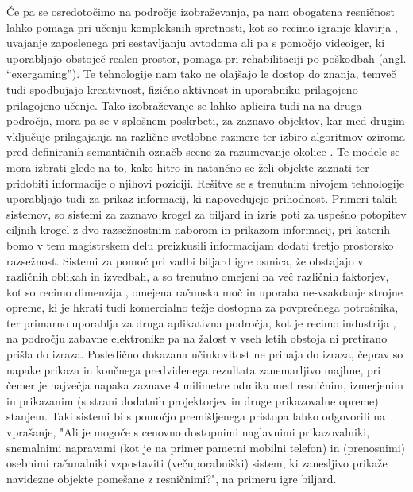 \documentclass[a4paper, 12pt]{book}
\begin{document}
Če pa se osredotočimo na področje izobraževanja, pa nam obogatena resničnost lahko pomaga pri učenju kompleksnih spretnosti, kot so recimo igranje klavirja \cite{McKenzie2022PianoVision}, uvajanje zaposlenega pri sestavljanju avtodoma ali pa s pomočjo videoiger, ki uporabljajo obstoječ realen prostor, pomaga pri rehabilitaciji po poškodbah (angl. ``exergaming'')\cite{Chow2023Exergaming}. Te tehnologije nam tako ne olajšajo le dostop do znanja, temveč tudi spodbujajo kreativnost, fizično aktivnost in uporabniku prilagojeno prilagojeno učenje.  Tako izobraževanje se lahko aplicira tudi na na druga področja, mora pa se v splošnem poskrbeti, za zaznavo objektov, kar med drugim vključuje prilagajanja na različne svetlobne razmere ter izbiro algoritmov oziroma pred-definiranih semantičnih označb scene za razumevanje okolice \cite{MetaDevelopers2024b}. Te modele se mora izbrati glede na to, kako hitro in natančno se želi objekte zaznati ter pridobiti informacije o njihovi poziciji. Rešitve se s trenutnim nivojem tehnologije uporabljajo tudi za prikaz informacij, ki napovedujejo prihodnost. Primeri takih sistemov, so sistemi za zaznavo krogel za biljard in izris poti za uspešno potopitev ciljnih krogel z dvo-razsežnostnim naborom in prikazom informacij, pri katerih bomo v tem magistrskem delu preizkusili informacijam dodati tretjo prostorsko razsežnost.
Sistemi za pomoč pri vadbi biljard igre osmica, že obstajajo v različnih oblikah in izvedbah, a so trenutno omejeni na več različnih faktorjev, kot so recimo dimenzija \cite{Sousa2016,BWisePool2025, schiott2025pix2pocketsshotsuggestions8ball}, omejena računska moč \cite{Yan2024Enhancing} in uporaba ne-vsakdanje strojne opreme, ki je hkrati tudi komercialno težje dostopna za povprečnega potrošnika, ter primarno uporablja za druga aplikativna področja, kot je recimo industrija \cite{Sousa2016, Yan2024Enhancing}, na področju zabavne elektronike pa na žalost v vseh letih obstoja ni pretirano prišla do izraza. Posledično dokazana učinkovitost ne prihaja do izraza, čeprav so napake prikaza in končnega predvidenega rezultata zanemarljivo majhne, pri čemer je največja napaka zaznave 4 milimetre odmika med resničnim, izmerjenim in prikazanim (s strani dodatnih projektorjev in druge prikazovalne opreme) stanjem. Taki sistemi bi s pomočjo premišljenega pristopa lahko odgovorili na vprašanje, "Ali je mogoče s cenovno dostopnimi naglavnimi prikazovalniki, snemalnimi napravami (kot je na primer pametni mobilni telefon) in (prenosnimi) osebnimi računalniki vzpostaviti (večuporabniški) sistem, ki zanesljivo prikaže navidezne objekte pomešane z resničnimi?", na primeru igre biljard. 
\end{document}
